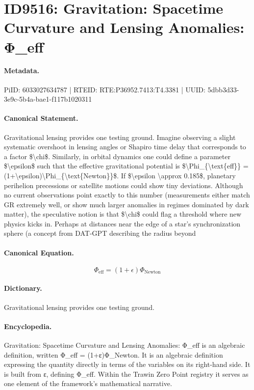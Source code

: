 \section*{ID9516: Gravitation: Spacetime Curvature and Lensing Anomalies: Φ\_eff}
\paragraph{Metadata.}
PiID: 6033027634787 | RTEID: RTE:P36952.7413:T4.3381 | UUID: 5dbb3d33-3e9c-5b4a-bae1-f117b1020311

\paragraph{Canonical Statement.}
Gravitational lensing provides one testing ground. Imagine observing a slight systematic overshoot in lensing angles or Shapiro time delay that corresponds to a factor \$\textbackslash{}chi\$. Similarly, in orbital dynamics one could define a parameter \$\textbackslash{}epsilon\$ such that the effective gravitational potential is \$\textbackslash{}Phi\_\{\textbackslash{}text\{eff\}\} = (1+\textbackslash{}epsilon)\textbackslash{}Phi\_\{\textbackslash{}text\{Newton\}\}\$. If \$\textbackslash{}epsilon \textbackslash{}approx 0.185\$, planetary perihelion precessions or satellite motions could show tiny deviations. Although no current observations point exactly to this number (measurements either match GR extremely well, or show much larger anomalies in regimes dominated by dark matter), the speculative notion is that \$\textbackslash{}chi\$ could flag a threshold where new physics kicks in. Perhaps at distances near the edge of a star’s synchronization sphere (a concept from DAT-GPT describing the radius beyond

\paragraph{Canonical Equation.}
\[
\Phi_{\text{eff}} = (1+\epsilon)\Phi_{\text{Newton}}
\]

\paragraph{Dictionary.}
Gravitational lensing provides one testing ground.

\paragraph{Encyclopedia.}
Gravitation: Spacetime Curvature and Lensing Anomalies: Φ\_eff is an algebraic definition, written Φ\_eff = (1+ε)Φ\_Newton. It is an algebraic definition expressing the quantity directly in terms of the variables on its right-hand side. It is built from ε, defining Φ\_eff. Within the Trawin Zero Point registry it serves as one element of the framework's mathematical narrative.
